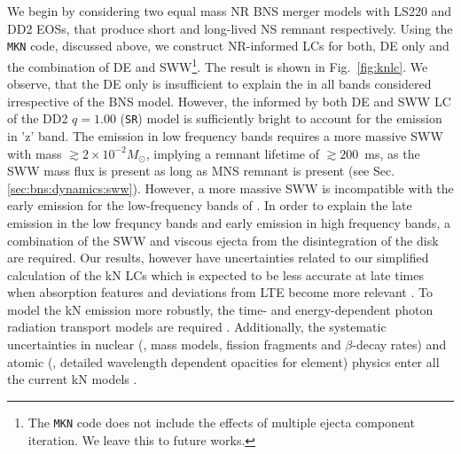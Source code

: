 We begin by considering two equal mass \ac{NR} \ac{BNS} merger models with LS220 
and DD2 \acp{EOS}, that produce short and long-lived \ac{NS} remnant respectively. 
Using the \texttt{MKN} code, discussed above, we construct \ac{NR}-informed 
\acp{LC} for both, \ac{DE} only and the combination of \ac{DE} and \ac{SWW}\footnote{
    The \texttt{MKN} code does not include the effects of multiple ejecta component 
    iteration. We leave this to future works.
}.
The result is shown in Fig.~\ref{fig:knlc}.
We observe, that the \ac{DE} only is insufficient to explain the \AT{} in 
all bands considered irrespective of the \ac{BNS} model. However, the informed 
by both \ac{DE} and \ac{SWW} \ac{LC} of the DD2 $q=1.00$ (\texttt{SR}) model 
is sufficiently bright to account for the emission in 'z' band. 
The emission in low frequency bands requires a more massive 
\ac{SWW} with mass ${\gtrsim} 2\times10^{-2}M_{\odot}$, implying a remnant lifetime of ${\gtrsim}200$~ms, as the \ac{SWW} mass flux is present as long 
as \ac{MNS} remnant is present (see Sec.\ref{sec:bns:dynamics:sww}).
However, a more massive \ac{SWW} is incompatible with
the early emission for the low-frequency bands of \AT{}.
In order to explain the late emission in the low frequncy bands and 
early emission in high frequency bands, a combination of the \ac{SWW} and 
viscous ejecta from the disintegration of the disk are required.
Our results, however have uncertainties related to our simplified calculation of
the \ac{kN} \acp{LC} which is expected to be less accurate at
late times when absorption features and deviations from \ac{LTE} become more relevant \citep[see \eg][]{Smartt:2017fuw}.
To model the \ac{kN} emission more robustly, the time- and energy-dependent 
photon radiation transport models are required 
\citep{Kasen:2017sxr,Tanaka:2017qxj,Miller:2019dpt,Bulla:2019muo}.
Additionally, the systematic uncertainties in
nuclear (\eg, mass models, fission fragments and $\beta$-decay
rates) and atomic (\eg, detailed wavelength dependent opacities for
\rproc{} element) physics enter all the current \ac{kN} models 
\citep{Eichler:2014kma,Rosswog:2016dhy,Gaigalas:2019ptx}.




